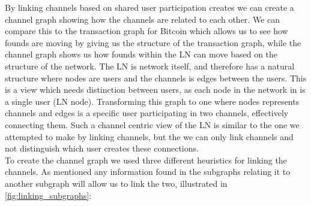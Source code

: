 By linking channels based on shared user participation creates we can create a channel graph showing how the channels are related to each other. We can compare this to the transaction graph for Bitcoin which allows us to see how founds are moving by giving us the structure of the transaction graph, while the channel graph shows us how founds within the LN can move based on the structure of the network.
The LN is network itself, and therefore has a natural structure where nodes are users and the channels is edges between the users. This is a view which needs distinction between users, as each node in the network in is a single user (LN node). Transforming this graph to one where nodes represents channels and edges is a specific user participating in two channels, effectively connecting them. Such a channel centric view of the LN is similar to the one we attempted to make by linking channels, but the we can only link channels and not distinguish which user creates these connections.
\\

To create the channel graph we used three different heuristics for linking the channels. 
As mentioned any information found in the subgraphs relating it to another subgraph will allow us to link the two, illustrated in \cref{fig:linking_subgraphs}:

